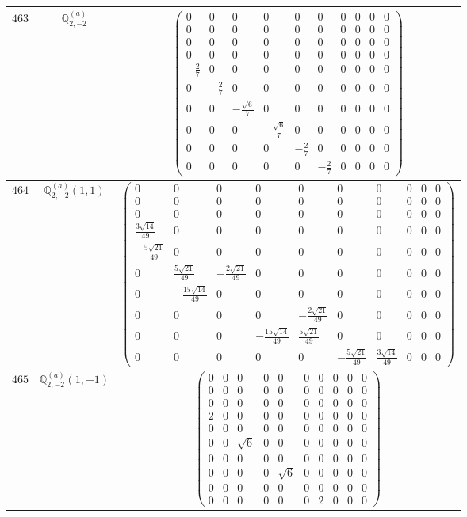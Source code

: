 \documentclass[fleqn,8pt,landscape]{jsarticle}
\begin{document}
\begin{center}
\begin{longtable}{ccc}
$ 463 $ & $ \mathbb{Q}_{2,-2}^{(a)} $ & $ \begin{pmatrix} 0 & 0 & 0 & 0 & 0 & 0 & 0 & 0 & 0 & 0 \\ 0 & 0 & 0 & 0 & 0 & 0 & 0 & 0 & 0 & 0 \\ 0 & 0 & 0 & 0 & 0 & 0 & 0 & 0 & 0 & 0 \\ 0 & 0 & 0 & 0 & 0 & 0 & 0 & 0 & 0 & 0 \\ - \frac{2}{7} & 0 & 0 & 0 & 0 & 0 & 0 & 0 & 0 & 0 \\ 0 & - \frac{2}{7} & 0 & 0 & 0 & 0 & 0 & 0 & 0 & 0 \\ 0 & 0 & - \frac{\sqrt{6}}{7} & 0 & 0 & 0 & 0 & 0 & 0 & 0 \\ 0 & 0 & 0 & - \frac{\sqrt{6}}{7} & 0 & 0 & 0 & 0 & 0 & 0 \\ 0 & 0 & 0 & 0 & - \frac{2}{7} & 0 & 0 & 0 & 0 & 0 \\ 0 & 0 & 0 & 0 & 0 & - \frac{2}{7} & 0 & 0 & 0 & 0 \end{pmatrix} $ \\ \hline
$ 464 $ & $ \mathbb{Q}_{2,-2}^{(a)}(1,1) $ & $ \begin{pmatrix} 0 & 0 & 0 & 0 & 0 & 0 & 0 & 0 & 0 & 0 \\ 0 & 0 & 0 & 0 & 0 & 0 & 0 & 0 & 0 & 0 \\ 0 & 0 & 0 & 0 & 0 & 0 & 0 & 0 & 0 & 0 \\ \frac{3 \sqrt{14}}{49} & 0 & 0 & 0 & 0 & 0 & 0 & 0 & 0 & 0 \\ - \frac{5 \sqrt{21}}{49} & 0 & 0 & 0 & 0 & 0 & 0 & 0 & 0 & 0 \\ 0 & \frac{5 \sqrt{21}}{49} & - \frac{2 \sqrt{21}}{49} & 0 & 0 & 0 & 0 & 0 & 0 & 0 \\ 0 & - \frac{15 \sqrt{14}}{49} & 0 & 0 & 0 & 0 & 0 & 0 & 0 & 0 \\ 0 & 0 & 0 & 0 & - \frac{2 \sqrt{21}}{49} & 0 & 0 & 0 & 0 & 0 \\ 0 & 0 & 0 & - \frac{15 \sqrt{14}}{49} & \frac{5 \sqrt{21}}{49} & 0 & 0 & 0 & 0 & 0 \\ 0 & 0 & 0 & 0 & 0 & - \frac{5 \sqrt{21}}{49} & \frac{3 \sqrt{14}}{49} & 0 & 0 & 0 \end{pmatrix} $ \\ \hline
$ 465 $ & $ \mathbb{Q}_{2,-2}^{(a)}(1,-1) $ & $ \begin{pmatrix} 0 & 0 & 0 & 0 & 0 & 0 & 0 & 0 & 0 & 0 \\ 0 & 0 & 0 & 0 & 0 & 0 & 0 & 0 & 0 & 0 \\ 0 & 0 & 0 & 0 & 0 & 0 & 0 & 0 & 0 & 0 \\ 2 & 0 & 0 & 0 & 0 & 0 & 0 & 0 & 0 & 0 \\ 0 & 0 & 0 & 0 & 0 & 0 & 0 & 0 & 0 & 0 \\ 0 & 0 & \sqrt{6} & 0 & 0 & 0 & 0 & 0 & 0 & 0 \\ 0 & 0 & 0 & 0 & 0 & 0 & 0 & 0 & 0 & 0 \\ 0 & 0 & 0 & 0 & \sqrt{6} & 0 & 0 & 0 & 0 & 0 \\ 0 & 0 & 0 & 0 & 0 & 0 & 0 & 0 & 0 & 0 \\ 0 & 0 & 0 & 0 & 0 & 0 & 2 & 0 & 0 & 0 \end{pmatrix} $ \\ \hline

\end{longtable}
\end{center}
\end{document}
